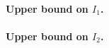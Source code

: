\documentclass{article}
\newcommand{\1}{\mathbf{1}}
\theoremstyle{definition}
\theoremstyle{remark}
\begin{document}
\paragraph{Upper bound on $I_1$.}

\paragraph{Upper bound on $I_2$.}
\end{document}
